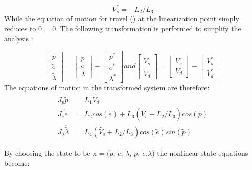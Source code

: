 \begin{equation}
  \label{eq:V^*_s value}
  V^{*}_{s} = -L_{2} / L_{3}
\end{equation}
While the equation of motion for travel () at the linearization point simply reduces to 0 = 0.
The following transformation is performed to simplify the analysis
\cite[p.14]{assignment}:

\begin{equation}
  \label{eq:transformation}
  \begin{bmatrix}
    \tilde{p} \\
    \tilde{e} \\
    \tilde{\lambda}
  \end{bmatrix}
  =
  \begin{bmatrix}
    p \\
    e \\
    \lambda
  \end{bmatrix}
  -
  \begin{bmatrix}
    p^{*} \\
    e^{*} \\
    \lambda^{*}
  \end{bmatrix}
  and
  \begin{bmatrix}
    \tilde{V}_{s} \\
    \tilde{V}_{d}
  \end{bmatrix}
  =
  \begin{bmatrix}
    V_{s} \\
    V_{d}
  \end{bmatrix}
  -
  \begin{bmatrix}
    V^{*}_{s} \\
    V^{*}_{d}
  \end{bmatrix}
\end{equation}
The equations of motion in the transformed system are therefore:
\begin{subequations}
  \begin{align}
    J_p\ddot{\tilde{p}} &= L_1\tilde{V_d} \label{eq:transformed pitch EoM}\\
    J_e\ddot{\tilde{e}} &= L_2cos(\tilde{e}) + L_3(\tilde{V_s}+L_2/L_3)cos(\tilde{p}) \label{eq:transformed elevation EoM}\\
    J_{\lambda}\ddot{\tilde{\lambda}} &= L_4(\tilde{V_s}+L_2/L_3)cos(\tilde{e})sin(\tilde{p}) \label{eq:transformed travel EoM}
  \end{align}
\end{subequations}

By choosing the state to be x = ($\tilde{p}$, $\tilde{e}$,
$\tilde{\lambda}$, \textit{$\dot{p}$, $\dot{e}$,$\dot{\lambda}$}) the
nonlinear state equations become:

